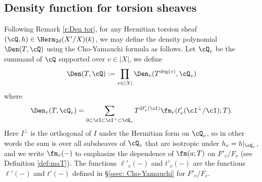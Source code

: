 %




\subsection{Density function for torsion sheaves}\label{ssec: density function for torsion sheaves}

Following Remark \ref{r:Den tor}, for any Hermitian torsion sheaf $(\cQ,h)\in \Herm_{2d}(X'/X)(k)$, we may define the density  polynomial $\Den(T,\cQ)$ using the Cho-Yamauchi formula as follows. Let $\cQ_{v}$ be the summand of $\cQ$ supported over $v\in |X|$, we define
\begin{equation*}
\Den(T,\cQ):=\prod_{v\in|X|}\Den_{v}(T^{\deg(v)}, \cQ_{v})
\end{equation*}
where
\begin{equation*}
\Den_{v}(T, \cQ_{v})=\sum_{0\subset\cI\subset \cI^{\bot}\subset \cQ_{v}} T^{2\ell'_{v}(\cI)}\fm_{v}(t'_{v}(\cI^{\bot}/\cI);T).
\end{equation*}
Here $I^\perp$ is the orthogonal of $I$ under the Hermitian form on $\cQ_v$, so in other words the sum is over all subsheaves of $\cQ_{v}$ that are isotropic under $h_{v}=h|_{\cQ_{v}}$, and we write $\fm_{v}(-)$ to emphasize the dependence of $\fm(a;T)$ on $F'_{v}/F_{v}$ (see Definition \ref{def:maT}). The functions $\ell'_{v}(-)$ and $t'_{v}(-)$ are the functions $\ell'(-)$ and $t'(-)$ defined in \S \ref{ssec: Cho-Yamauchi} for $F'_{v}/F_{v}$.

